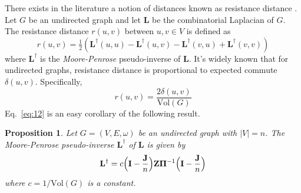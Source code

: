 \documentclass[10pt,twocolumn]{article}
\newtheorem{proposition}[theorem]{Proposition}
\numberwithin{equation}{section}
\begin{document}
There exists in the literature a notion of distances known as
resistance distance
\cite{bapat99:_resis_distan_in_graph,klein93:_resis_distan}. Let $G$
be an undirected graph and let $\mathbf{L}$ be the combinatorial
Laplacian of $G$. The resistance distance $r(u,v)$ between $u, v \in
V$ is defined as
\begin{equation*}
  r(u,v) = \tfrac{1}{2}(\mathbf{L}^{\dagger}(u,u) - \mathbf{L}^{\dagger}(u,v) -
  \mathbf{L}^{\dagger}(v,u) + \mathbf{L}^{\dagger}(v,v))
\end{equation*}
where $\mathbf{L}^{\dagger}$ is the {\em Moore-Penrose}
\/pseudo-inverse of $\mathbf{L}$. It's widely known that for
undirected graphs, resistance distance is proportional to expected
commute $\delta(u,v)$. Specifically,
\begin{equation}
  \label{eq:12}
  r(u,v) = \frac{2 \delta(u,v)}{\mathrm{Vol}(G)}
\end{equation}
Eq.~\eqref{eq:12} is an easy corollary of the following result.
\begin{proposition}
  \label{prop:5}
  Let $G = (V,E,\omega)$ be an undirected graph with $|V| = n$. The
  Moore-Penrose pseudo-inverse $\mathbf{L}^{\dagger}$ of $\mathbf{L}$
  is given by
  \begin{equation}
    \label{eq:13}
    \mathbf{L}^{\dagger} = c \Bigl(\mathbf{I} - \frac{\mathbf{J}}{n}\Bigr) \mathbf{Z}
    \bm{\Pi}^{-1} \Bigl(\mathbf{I} - \frac{\mathbf{J}}{n}\Bigr)
  \end{equation}
  where $c = 1/\mathrm{Vol}(G)$ is a constant. 
\end{proposition}
\end{document}
